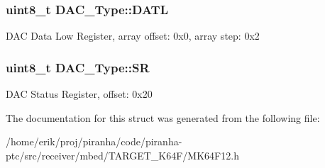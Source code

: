 \subsubsection[{\texorpdfstring{D\+A\+TL}{DATL}}]{ uint8\+\_\+t D\+A\+C\+\_\+\+Type\+::\+D\+A\+TL}\hypertarget{structDAC__Type_a0f61f3cd5d904066d9050e97aab24734}{}\label{structDAC__Type_a0f61f3cd5d904066d9050e97aab24734}
D\+AC Data Low Register, array offset\+: 0x0, array step\+: 0x2 
\subsubsection[{\texorpdfstring{SR}{SR}}]{ uint8\+\_\+t D\+A\+C\+\_\+\+Type\+::\+SR}\hypertarget{structDAC__Type_acee3e246d2964c0a7165755319ad8d72}{}\label{structDAC__Type_acee3e246d2964c0a7165755319ad8d72}
D\+AC Status Register, offset\+: 0x20 

The documentation for this struct was generated from the following file\+:\begin{DoxyCompactItemize}
\item 
/home/erik/proj/piranha/code/piranha-\/ptc/src/receiver/mbed/\+T\+A\+R\+G\+E\+T\+\_\+\+K64\+F/M\+K64\+F12.\+h\end{DoxyCompactItemize}
